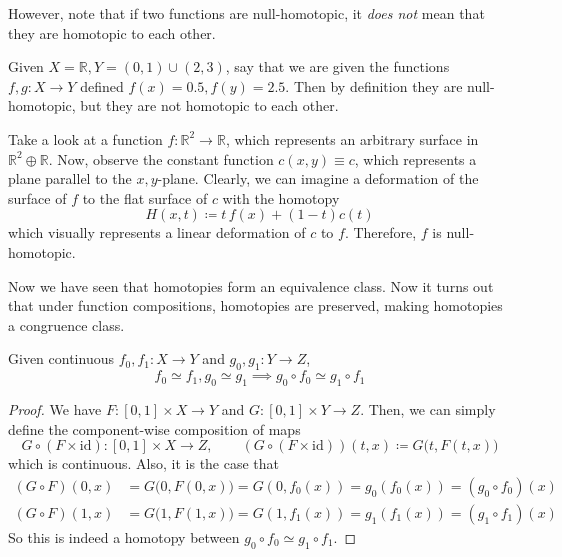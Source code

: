   However, note that if two functions are null-homotopic, it \textit{does not} mean that they are homotopic to each other. 

  \begin{example}
    \label{ex:null-homotopic-paths-are-not-homotopic}
    Given $X = \mathbb{R}, Y = (0, 1) \cup (2, 3)$, say that we are given the functions $f, g: X \to Y$ defined $f(x) = 0.5, f(y) = 2.5$. Then by definition they are null-homotopic, but they are not homotopic to each other. 
  \end{example}

	\begin{example}
	  \label{ex:null-homotopic-function}
    Take a look at a function $f: \mathbb{R}^2 \to \mathbb{R}$, which represents an arbitrary surface in $\mathbb{R}^2 \oplus \mathbb{R}$. Now, observe the constant function $c(x, y) \equiv c$, which represents a plane parallel to the $x, y$-plane. Clearly, we can imagine a deformation of the surface of $f$ to the flat surface of $c$ with the homotopy
    \begin{equation}
      H(x, t) \coloneqq t \, f(x) + (1-t) c(t)
    \end{equation}
    which visually represents a linear deformation of $c$ to $f$. Therefore, $f$ is null-homotopic. 
  \end{example}

  Now we have seen that homotopies form an equivalence class. Now it turns out that under function compositions, homotopies are preserved, making homotopies a congruence class. 

  \begin{theorem}
    \label{thm:homotopies-is-a-congruence-relation-under}
    Given continuous $f_0, f_1: X \to Y$ and $g_0, g_1: Y \to Z$, 
    \begin{equation}
      f_0 \simeq f_1, g_0 \simeq g_1 \implies g_0 \circ f_0 \simeq g_1 \circ f_1 
    \end{equation}
  \end{theorem}
  \begin{proof}
    We have $F: [0, 1] \times X \to Y$ and $G: [0, 1] \times Y \to Z$. Then, we can simply define the component-wise composition of maps
    \begin{equation}
      G \circ (F \times \mathrm{id}): [0, 1] \times X \to Z, \qquad (G \circ (F \times \mathrm{id})) (t, x) \coloneqq G \big(t, F(t, x) \big)
    \end{equation} 
    which is continuous. Also, it is the case that 
    \begin{align}
      (G \circ F) (0, x) & = G\big(0, F(0, x) \big) = G (0, f_0 (x)) = g_0 (f_0 (x)) = (g_0 \circ f_0) (x) \\ 
      (G \circ F) (1, x) & = G\big(1, F(1, x) \big) = G (1, f_1 (x)) = g_1 (f_1 (x)) = (g_1 \circ f_1) (x) 
    \end{align}
    So this is indeed a homotopy between $g_0 \circ f_0 \simeq g_1 \circ f_1$. 
  \end{proof}

